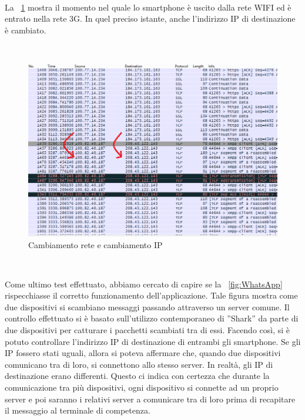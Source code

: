 \documentclass[a4paper,11pt]{book}
\begin{document}
~

La \figurename ~\ref{fig:ip-changed} mostra il momento nel quale lo smartphone \`e uscito dalla rete WIFI ed \`e entrato nella rete 3G. In quel preciso istante, anche l'indirizzo IP di destinazione  \`e cambiato.

~

\begin{figure}[!ht]
\centering
\includegraphics[scale = 0.5]{ip-changed}
\caption{Cambiamento rete e cambiamento IP}
\label{fig:ip-changed}
\end{figure}

~


\clearpage 

Come ultimo test effettuato, abbiamo cercato di capire se la \figurename ~\ref{fig:WhatsApp} rispecchiasse il corretto funzionamento dell'applicazione.
Tale figura mostra come due dispositivi si scambiano messaggi passando attraverso un server comune. 
Il controllo effettuato si \`e basato sull'utilizzo contemporaneo di ''Shark'' da parte di due dispositivi per catturare i pacchetti scambiati tra di essi. 
Facendo cos\`i, si \`e potuto controllare l'indirizzo IP di destinazione di entrambi gli smartphone. Se gli IP fossero stati uguali, allora si poteva affermare che, quando due dispositivi comunicano tra di loro, si connettono allo stesso server.
In realt\`a, gli IP di destinazione erano differenti. Questo ci indica con certezza che durante la comunicazione tra pi\`u dispositivi, ogni dispositivo si connette ad un proprio server e poi saranno i relativi server a comunicare tra di loro prima di recapitare il messaggio al terminale di competenza.

~
\end{document}

